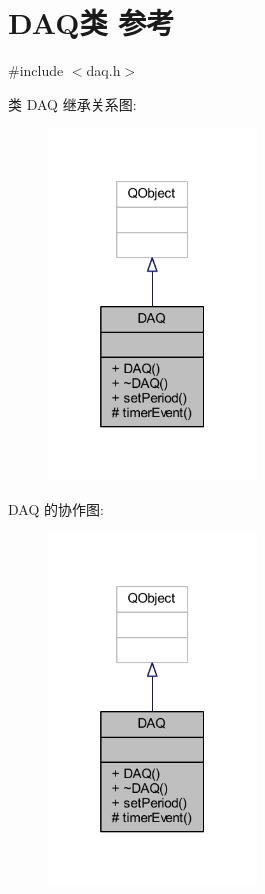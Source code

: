 \hypertarget{class_d_a_q}{}\section{D\+A\+Q类 参考}
\label{class_d_a_q}


{\ttfamily \#include $<$daq.\+h$>$}



类 D\+AQ 继承关系图\+:
\nopagebreak
\begin{figure}[H]
\begin{center}
\leavevmode
\includegraphics[width=157pt]{class_d_a_q__inherit__graph}
\end{center}
\end{figure}


D\+AQ 的协作图\+:
\nopagebreak
\begin{figure}[H]
\begin{center}
\leavevmode
\includegraphics[width=157pt]{class_d_a_q__coll__graph}
\end{center}
\end{figure}
